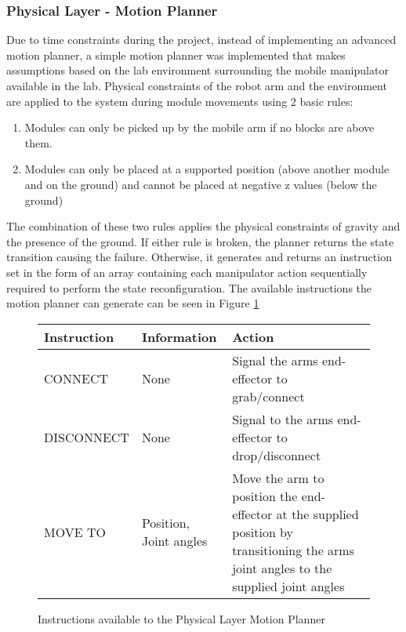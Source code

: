 \subsubsection{Physical Layer - Motion Planner}
Due to time constraints during the project, instead of implementing an advanced motion planner, a simple motion planner was implemented that makes assumptions based on the lab environment surrounding the mobile manipulator available in the lab. Physical constraints of the robot arm and the environment are applied to the system during module movements using 2 basic rules:
\begin{enumerate}[]
	\item Modules can only be picked up by the mobile arm if no blocks are above them.
	\item Modules can only be placed at a supported position (above another module and on the ground) and cannot be placed at negative z values (below the ground)
\end{enumerate}
The combination of these two rules applies the physical constraints of gravity and the presence of the ground. If either rule is broken, the planner returns the state transition causing the failure. Otherwise, it generates and returns an instruction set in the form of an array containing each manipulator action sequentially required to perform the state reconfiguration. The available instructions the motion planner can generate can be seen in Figure \ref{instructions}

\begin{figure}[H]
	\begin{tabularx}{\textwidth} {| p{} | p{} | X |}
		\hline
		\textbf{Instruction} & \textbf{Information} & \textbf{Action}\\
		\hline
		CONNECT 	 & None	& Signal the arms end-effector to grab/connect\\
		\hline
		DISCONNECT   & None & Signal to the arms end-effector to drop/disconnect\\
		\hline
		MOVE TO 	 & Position, Joint angles & Move the arm to position the end-effector at the supplied position by transitioning the arms joint angles to the supplied joint angles\\
		\hline
	\end{tabularx}
	\caption{Instructions available to the Physical Layer Motion Planner}
	\label{instructions}
\end{figure}

